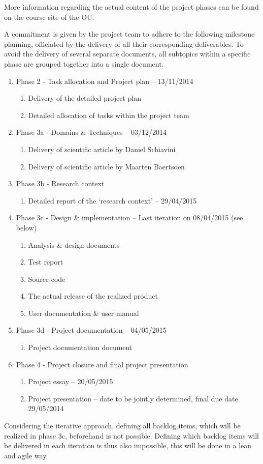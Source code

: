 More information regarding the actual content of the project phases can be found on the course site of the OU. 

A commitment is given by the project team to adhere to the following milestone planning, officiated by the delivery of all their corresponding deliverables. To avoid the delivery of several separate documents, all subtopics within a specific phase are grouped together into a single document.

 \begin{enumerate}
	\item Phase 2 - Task allocation and Project plan			-- 	13/11/2014
 	\begin{enumerate}
		\item Delivery of the detailed project plan 			
		\item Detailed allocation of tasks within the project team 
	\end {enumerate}
	\item Phase 3a - Domains \& Techniques					-- 	03/12/2014
 	\begin{enumerate}
		\item Delivery of scientific article by Daniel Schiavini
		\item Delivery of scientific article by Maarten Baertsoen
	\end {enumerate}
 	\item Phase 3b - Research context
 	\begin{enumerate}
		\item Detailed report of the `research context'  		-- 	29/04/2015
	\end {enumerate}
 	\item Phase 3c - Design \& implementation				-- Last iteration on 08/04/2015 (see below)
 	\begin{enumerate}
		\item Analysis \& design documents
		\item Test report
		\item Source code
		\item The actual release of the realized product
		\item User documentation \& user manual
	\end {enumerate}
 	\item Phase 3d - Project documentation					-- 	04/05/2015
 	\begin{enumerate}
		\item Project documentation document	
	\end {enumerate}
	\item Phase 4 - Project closure and final project presentation
 	\begin{enumerate}
		\item Project essay							-- 	20/05/2015
		\item Project presentation						-- 	date to be jointly determined, final due date 29/05/2014
	\end {enumerate}
\end {enumerate}
%
Considering the iterative approach, defining all backlog items, which will be realized in phase 3c, beforehand is not possible.
Defining which backlog items will be delivered in each iteration is thus also impossible, this will be done in a lean and agile way.

